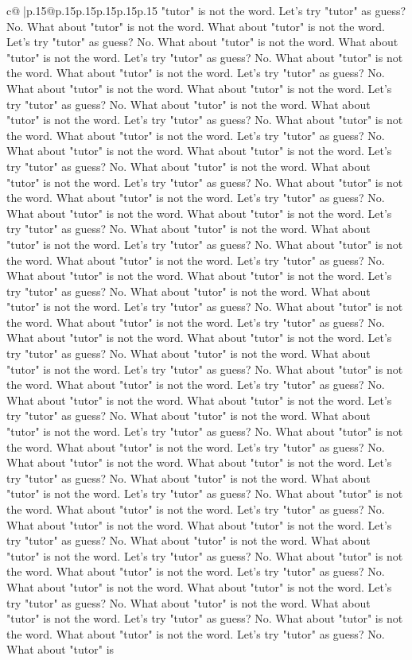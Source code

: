 \documentclass{article}
\begin{document}
{\begin{supertabular}{c@{$\;$}|p{.15\linewidth}@{}p{.15\linewidth}p{.15\linewidth}p{.15\linewidth}p{.15\linewidth}p{.15\linewidth}}
{{{"tutor" is not the word. Let's try "tutor" as guess? No. What about "tutor" is not the word. What about "tutor" is not the word. Let's try "tutor" as guess? No. What about "tutor" is not the word. What about "tutor" is not the word. Let's try "tutor" as guess? No. What about "tutor" is not the word. What about "tutor" is not the word. Let's try "tutor" as guess? No. What about "tutor" is not the word. What about "tutor" is not the word. Let's try "tutor" as guess? No. What about "tutor" is not the word. What about "tutor" is not the word. Let's try "tutor" as guess? No. What about "tutor" is not the word. What about "tutor" is not the word. Let's try "tutor" as guess? No. What about "tutor" is not the word. What about "tutor" is not the word. Let's try "tutor" as guess? No. What about "tutor" is not the word. What about "tutor" is not the word. Let's try "tutor" as guess? No. What about "tutor" is not the word. What about "tutor" is not the word. Let's try "tutor" as guess? No. What about "tutor" is not the word. What about "tutor" is not the word. Let's try "tutor" as guess? No. What about "tutor" is not the word. What about "tutor" is not the word. Let's try "tutor" as guess? No. What about "tutor" is not the word. What about "tutor" is not the word. Let's try "tutor" as guess? No. What about "tutor" is not the word. What about "tutor" is not the word. Let's try "tutor" as guess? No. What about "tutor" is not the word. What about "tutor" is not the word. Let's try "tutor" as guess? No. What about "tutor" is not the word. What about "tutor" is not the word. Let's try "tutor" as guess? No. What about "tutor" is not the word. What about "tutor" is not the word. Let's try "tutor" as guess? No. What about "tutor" is not the word. What about "tutor" is not the word. Let's try "tutor" as guess? No. What about "tutor" is not the word. What about "tutor" is not the word. Let's try "tutor" as guess? No. What about "tutor" is not the word. What about "tutor" is not the word. Let's try "tutor" as guess? No. What about "tutor" is not the word. What about "tutor" is not the word. Let's try "tutor" as guess? No. What about "tutor" is not the word. What about "tutor" is not the word. Let's try "tutor" as guess? No. What about "tutor" is not the word. What about "tutor" is not the word. Let's try "tutor" as guess? No. What about "tutor" is not the word. What about "tutor" is not the word. Let's try "tutor" as guess? No. What about "tutor" is not the word. What about "tutor" is not the word. Let's try "tutor" as guess? No. What about "tutor" is not the word. What about "tutor" is not the word. Let's try "tutor" as guess? No. What about "tutor" is not the word. What about "tutor" is not the word. Let's try "tutor" as guess? No. What about "tutor" is not the word. What about "tutor" is not the word. Let's try "tutor" as guess? No. What about "tutor" is not the word. What about "tutor" is not the word. Let's try "tutor" as guess? No. What about "tutor" is not the word. What about "tutor" is not the word. Let's try "tutor" as guess? No. What about "tutor" is not the word. What about "tutor" is not the word. Let's try "tutor" as guess? No. What about "tutor" is }}}
\end{supertabular}}
\end{document}
